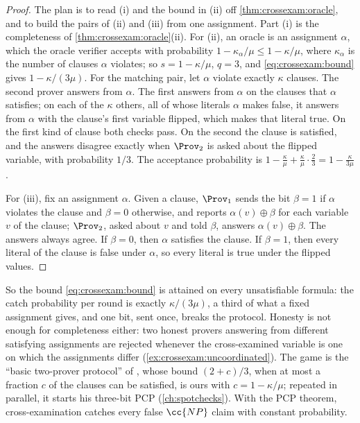 \begin{refsection}
\begin{proof}
The plan is to read (i) and the bound in (ii) off \cref{thm:crossexam:oracle}, and to build the pairs of (ii) and (iii) from one assignment. Part (i) is the completeness of \cref{thm:crossexam:oracle}(ii). For (ii), an oracle is an assignment $\alpha$, which the oracle verifier accepts with probability $1-\kappa_\alpha/\mu\le1-\kappa/\mu$, where $\kappa_\alpha$ is the number of clauses $\alpha$ violates; so $s=1-\kappa/\mu$, $q=3$, and \eqref{eq:crossexam:bound} gives $1-\kappa/(3\mu)$. For the matching pair, let $\alpha$ violate exactly $\kappa$ clauses. The second prover answers from $\alpha$. The first answers from $\alpha$ on the clauses that $\alpha$ satisfies; on each of the $\kappa$ others, all of whose literals $\alpha$ makes false, it answers from $\alpha$ with the clause's first variable flipped, which makes that literal true. On the first kind of clause both checks pass. On the second the clause is satisfied, and the answers disagree exactly when $\Prov_2$ is asked about the flipped variable, with probability $1/3$. The acceptance probability is $1-\frac\kappa\mu+\frac\kappa\mu\cdot\frac23=1-\frac{\kappa}{3\mu}$.

For (iii), fix an assignment $\alpha$. Given a clause, $\Prov_1$ sends the bit $\beta=1$ if $\alpha$ violates the clause and $\beta=0$ otherwise, and reports $\alpha(v)\oplus\beta$ for each variable $v$ of the clause; $\Prov_2$, asked about $v$ and told $\beta$, answers $\alpha(v)\oplus\beta$. The answers always agree. If $\beta=0$, then $\alpha$ satisfies the clause. If $\beta=1$, then every literal of the clause is false under $\alpha$, so every literal is true under the flipped values.
\end{proof}

So the bound \eqref{eq:crossexam:bound} is attained on every unsatisfiable formula: the catch probability per round is exactly $\kappa/(3\mu)$, a third of what a fixed assignment gives, and one bit, sent once, breaks the protocol. Honesty is not enough for completeness either: two honest provers answering from different satisfying assignments are rejected whenever the cross-examined variable is one on which the assignments differ (\cref{ex:crossexam:uncoordinated}). The game is the ``basic two-prover protocol'' of \textcite{Hastad2001}, whose bound $(2+c)/3$, when at most a fraction $c$ of the clauses can be satisfied, is ours with $c=1-\kappa/\mu$; repeated in parallel, it starts his three-bit PCP (\cref{ch:spotchecks}). With the PCP theorem, cross-examination catches every false $\cc{NP}$ claim with constant probability.


\end{refsection}
